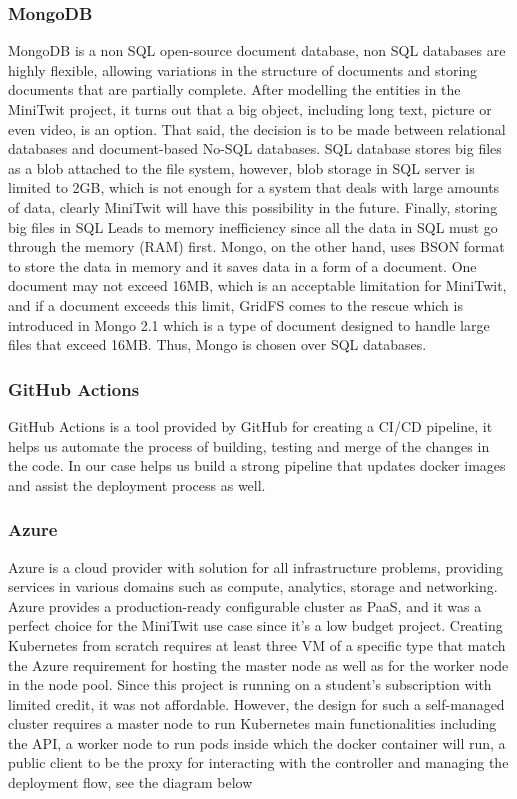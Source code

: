\subsubsection{MongoDB}
MongoDB is a non SQL open-source document database, non SQL databases are highly flexible, allowing variations in the structure of documents and storing documents that are partially complete. After modelling the entities in the MiniTwit project, it turns out that a big object, including long text, picture or even video, is an option. That said, the decision is to be made between relational databases and document-based No-SQL databases. SQL database stores big files as a blob attached to the file system, however, blob storage in SQL server is limited to 2GB, which is not enough for a system that deals with large amounts of data, clearly MiniTwit will have this possibility in the future. Finally, storing big files in SQL Leads to memory inefficiency since all the data in SQL must go through the memory (RAM) first. Mongo, on the other hand, uses BSON format to store the data in memory and it saves data in a form of a document. One document may not exceed 16MB, which is an acceptable limitation for MiniTwit, and if a document exceeds this limit, GridFS comes to the rescue which is introduced in Mongo 2.1 which is a type of document designed to handle large files that exceed 16MB. Thus, Mongo is chosen over SQL databases.

\subsubsection{GitHub Actions}
GitHub Actions is a tool provided by GitHub for creating a CI/CD pipeline, it helps us automate the process of building, testing and merge of the changes in the code. In our case helps us build a strong pipeline that updates docker images and assist the deployment process as well.

\subsubsection{Azure}
Azure is a cloud provider with solution for all infrastructure problems, providing services in various domains such as compute, analytics, storage and networking. Azure provides a production-ready configurable cluster as PaaS, and it was a perfect choice for the MiniTwit use case since it's a low budget project. Creating Kubernetes from scratch requires at least three VM of a specific type that match the Azure requirement for hosting the master node as well as for the worker node in the node pool. Since this project is running on a student’s subscription with limited credit, it was not affordable. However, the design for such a self-managed cluster requires a master node to run Kubernetes main functionalities including the API, a worker node to run pods inside which the docker container will run, a public client to be the proxy for interacting with the controller and managing the deployment flow, see the diagram below


